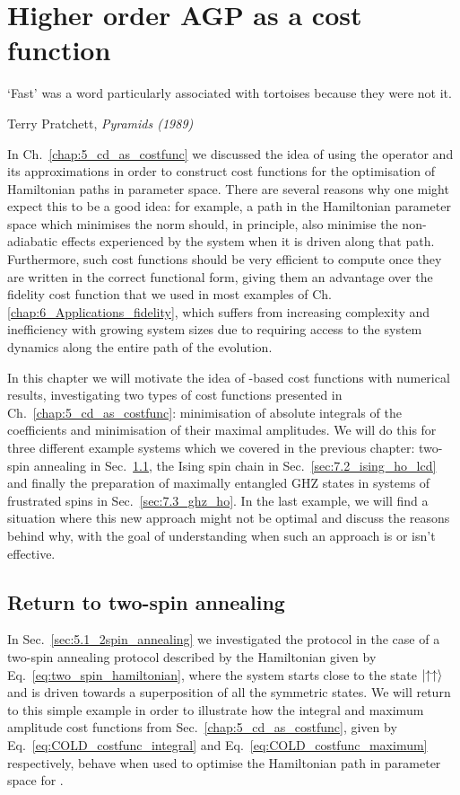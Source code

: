 \chapter{Higher order AGP as a cost function}\label{chap:7_higher_order_agp}

\epigraph{`Fast' was a word particularly associated with tortoises because they were not it.}{Terry Pratchett, \emph{Pyramids (1989)}}

In Ch.~\ref{chap:5_cd_as_costfunc} we discussed the idea of using the  operator and its approximations in order to construct cost functions for the optimisation of Hamiltonian paths in parameter space. There are several reasons why one might expect this to be a good idea: for example, a path in the Hamiltonian parameter space which minimises the  norm should, in principle, also minimise the non-adiabatic effects experienced by the system when it is driven along that path. Furthermore, such cost functions should be very efficient to compute once they are written in the correct functional form, giving them an advantage over the fidelity cost function that we used in most examples of Ch.\ref{chap:6_Applications_fidelity}, which suffers from increasing complexity and inefficiency with growing system sizes due to requiring access to the system dynamics along the entire path of the evolution.

In this chapter we will motivate the idea of -based cost functions with numerical results, investigating two types of cost functions presented in Ch.~\ref{chap:5_cd_as_costfunc}: minimisation of absolute integrals of the  coefficients and minimisation of their maximal amplitudes. We will do this for three different example systems which we covered in the previous chapter: two-spin annealing in Sec.~\ref{sec:7.1_two_spin_ho}, the Ising spin chain in Sec.~\ref{sec:7.2_ising_ho_lcd} and finally the preparation of maximally entangled GHZ states in systems of frustrated spins in Sec.~\ref{sec:7.3_ghz_ho}. In the last example, we will find a situation where this new approach might not be optimal and discuss the reasons behind why, with the goal of understanding when such an approach is or isn't effective. 

\section{Return to two-spin annealing}\label{sec:7.1_two_spin_ho}

In Sec.~\ref{sec:5.1_2spin_annealing} we investigated the  protocol in the case of a two-spin annealing protocol described by the Hamiltonian given by Eq.~\eqref{eq:two_spin_hamiltonian}, where the system starts close to the state $\ket{\uparrow\uparrow}$ and is driven towards a superposition of all the symmetric states. We will return to this simple example in order to illustrate how the integral and maximum amplitude cost functions from Sec.~\ref{chap:5_cd_as_costfunc}, given by Eq.~\eqref{eq:COLD_costfunc_integral} and Eq.~\eqref{eq:COLD_costfunc_maximum} respectively, behave when used to optimise the Hamiltonian path in parameter space for .

